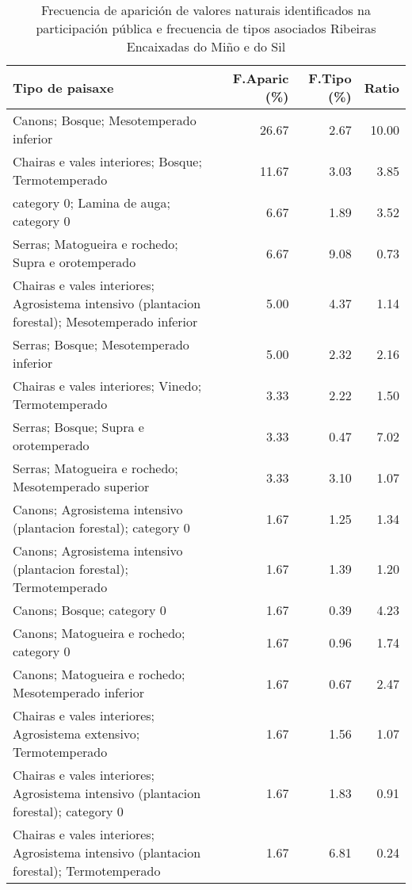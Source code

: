 \begin{table}[p]
\centering
\caption{Frecuencia de aparición de valores naturais identificados na participación pública e frecuencia de tipos asociados Ribeiras Encaixadas do Miño e do Sil} 
\label{vsixotnat4}
\begin{tabular}{lrrr}
  \hline
Tipo de paisaxe & F.Aparic (\%) & F.Tipo (\%) & Ratio \\ 
  \hline
Canons; Bosque; Mesotemperado inferior & 26.67 & 2.67 & 10.00 \\ 
  Chairas e vales interiores; Bosque; Termotemperado & 11.67 & 3.03 & 3.85 \\ 
  category 0; Lamina de auga; category 0 & 6.67 & 1.89 & 3.52 \\ 
  Serras; Matogueira e rochedo; Supra e orotemperado & 6.67 & 9.08 & 0.73 \\ 
  Chairas e vales interiores; Agrosistema intensivo (plantacion forestal); Mesotemperado inferior & 5.00 & 4.37 & 1.14 \\ 
  Serras; Bosque; Mesotemperado inferior & 5.00 & 2.32 & 2.16 \\ 
  Chairas e vales interiores; Vinedo; Termotemperado & 3.33 & 2.22 & 1.50 \\ 
  Serras; Bosque; Supra e orotemperado & 3.33 & 0.47 & 7.02 \\ 
  Serras; Matogueira e rochedo; Mesotemperado superior & 3.33 & 3.10 & 1.07 \\ 
  Canons; Agrosistema intensivo (plantacion forestal); category 0 & 1.67 & 1.25 & 1.34 \\ 
  Canons; Agrosistema intensivo (plantacion forestal); Termotemperado & 1.67 & 1.39 & 1.20 \\ 
  Canons; Bosque; category 0 & 1.67 & 0.39 & 4.23 \\ 
  Canons; Matogueira e rochedo; category 0 & 1.67 & 0.96 & 1.74 \\ 
  Canons; Matogueira e rochedo; Mesotemperado inferior & 1.67 & 0.67 & 2.47 \\ 
  Chairas e vales interiores; Agrosistema extensivo; Termotemperado & 1.67 & 1.56 & 1.07 \\ 
  Chairas e vales interiores; Agrosistema intensivo (plantacion forestal); category 0 & 1.67 & 1.83 & 0.91 \\ 
  Chairas e vales interiores; Agrosistema intensivo (plantacion forestal); Termotemperado & 1.67 & 6.81 & 0.24 \\ 

\end{tabular}
\end{table}
